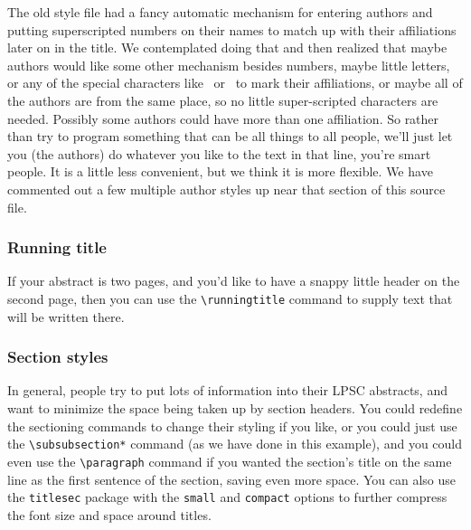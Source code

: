 \documentclass[twoside]{article}
\begin{document}
The old style file had a fancy automatic mechanism for entering
authors and putting superscripted numbers on their names to match
up with their affiliations later on in the title.  We contemplated
doing that and then realized that maybe authors would like some
other mechanism besides numbers, maybe little letters, or any of
the special characters like \dag\ or \ddag\ to mark their affiliations,
or maybe all of the authors are from the same place, so no little
super-scripted characters are needed.  Possibly some authors could
have more than one affiliation.  So rather than try to program
something that can be all things to all people, we'll just let you
(the authors) do whatever you like to the text in that line, you're
smart people.  It is a little less convenient, but we think it is more
flexible.  We have commented out a few multiple author styles up
near that section of this source file.

\subsubsection*{Running title}

If your abstract is two pages, and you'd like to have a snappy little
header on the second page, then you can use the \verb=\runningtitle=
command to supply text that will be written there.

\subsubsection*{Section styles}

In general, people try to put lots of information into their LPSC
abstracts, and want to minimize the space being taken up by section
headers.  You could redefine the sectioning commands to change their
styling if you like, or you could just use the \verb=\subsubsection*=
command (as we have done in this example), and
you could even use the \verb=\paragraph= command if you wanted the
section's title on the same line as the first sentence of the
section, saving even more space.  You can also use the \texttt{titlesec}
package with the \texttt{small} and \texttt{compact} options to further
compress the font size and space around titles.
\end{document}
